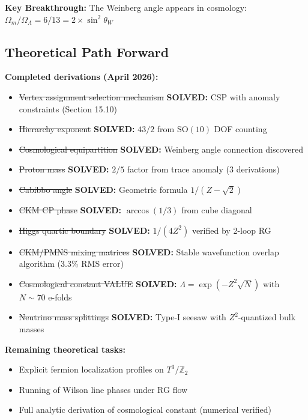 \documentclass[11pt,a4paper]{article}
\theoremstyle{plain}
\theoremstyle{definition}
\theoremstyle{remark}
\newcommand{\thetaW}{\theta_W}
\newcommand{\Omegam}{\Omega_m}
\newcommand{\OmegaL}{\Omega_\Lambda}
\newcommand{\Tthree}{T^3}
\newcommand{\Ztwo}{\mathbb{Z}_2}
\newcommand{\SOten}{\text{SO}(10)}
\begin{document}
\textbf{Key Breakthrough:} The Weinberg angle appears in cosmology: $\Omegam/\OmegaL = 6/13 = 2 \times \sin^2\thetaW$

\subsection{Theoretical Path Forward}

\textbf{Completed derivations (April 2026):}
\begin{itemize}
  \item \sout{Vertex assignment selection mechanism} \textbf{SOLVED:} CSP with anomaly constraints (Section 15.10)
  \item \sout{Hierarchy exponent} \textbf{SOLVED:} $43/2$ from $\SOten$ DOF counting
  \item \sout{Cosmological equipartition} \textbf{SOLVED:} Weinberg angle connection discovered
  \item \sout{Proton mass} \textbf{SOLVED:} $2/5$ factor from trace anomaly (3 derivations)
  \item \sout{Cabibbo angle} \textbf{SOLVED:} Geometric formula $1/(Z - \sqrt{2})$
  \item \sout{CKM CP phase} \textbf{SOLVED:} $\arccos(1/3)$ from cube diagonal
  \item \sout{Higgs quartic boundary} \textbf{SOLVED:} $1/(4Z^2)$ verified by 2-loop RG
  \item \sout{CKM/PMNS mixing matrices} \textbf{SOLVED:} Stable wavefunction overlap algorithm (3.3\% RMS error)
  \item \sout{Cosmological constant VALUE} \textbf{SOLVED:} $\Lambda = \exp(-Z^2\sqrt{N})$ with $N \sim 70$ e-folds
  \item \sout{Neutrino mass splittings} \textbf{SOLVED:} Type-I seesaw with $Z^2$-quantized bulk masses
\end{itemize}

\textbf{Remaining theoretical tasks:}
\begin{itemize}
  \item Explicit fermion localization profiles on $\Tthree/\Ztwo$
  \item Running of Wilson line phases under RG flow
  \item Full analytic derivation of cosmological constant (numerical verified)
\end{itemize}
\end{document}
